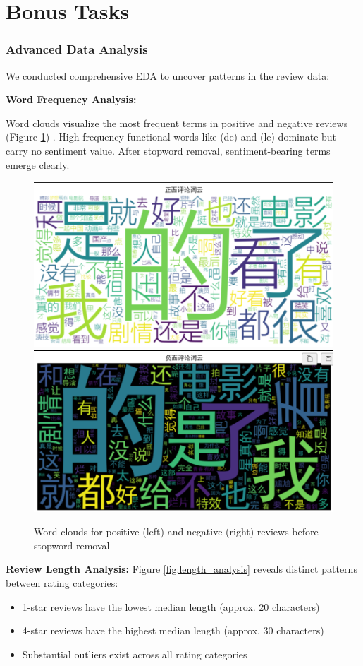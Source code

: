 \documentclass{article}
\begin{document}
\section{Bonus Tasks}
\label{sec:bonus}

\subsubsection{Advanced Data Analysis}
\label{sssec:advanced_analysis}

We conducted comprehensive EDA to uncover patterns in the review data:

\textbf{Word Frequency Analysis:} 

Word clouds visualize the most frequent terms in positive and negative reviews 
(Figure \ref{fig:wordclouds}) \cite{Zipf1949}. High-frequency functional words like (de) and (le) dominate 
but carry no sentiment value. After stopword removal, sentiment-bearing terms emerge clearly.

\begin{figure}[h]
    \centering
    \includegraphics[width=0.45\columnwidth]{pic/T2P2B1.1.png}
    \includegraphics[width=0.45\columnwidth]{pic/T2P2B1.2.png}
    \caption{Word clouds for positive (left) and negative (right) reviews before stopword removal}
    \label{fig:wordclouds}
\end{figure}

\textbf{Review Length Analysis:} 
Figure \ref{fig:length_analysis} reveals distinct patterns between rating categories:
\begin{itemize}
    \item 1-star reviews have the lowest median length (approx. 20 characters)
    \item 4-star reviews have the highest median length (approx. 30 characters)
    \item Substantial outliers exist across all rating categories
\end{itemize}
\end{document}
